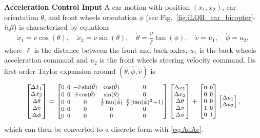 \documentclass[10pt,a4paper]{article} %
\begin{document}
\noindent\textbf{Acceleration Control Input}\newline
%
A car motion with position $(x_1,x_2)$, car orientation $\theta$, and front wheels orientation $\phi$ (see Fig.~\ref{fig:iLQR_car_bicopter}-\emph{left}) is characterized by equations
\begin{equation*}
	\dot{x}_1 = v \cos(\theta),\quad
	\dot{x}_2 = v \sin(\theta),\quad
	\dot{\theta} = \frac{v}{\ell} \tan(\phi),\quad
	\dot{v} = u_1,\quad
	\dot{\phi} = u_2,
\end{equation*}
where $\ell$ is the distance between the front and back axles, $u_1$ is the back wheels acceleration command and $u_2$ is the front wheels steering velocity command. 
Its first order Taylor expansion around $(\hat{\theta}, \hat{\phi}, \hat{v})$ is
\begin{equation}
	\setlength\arraycolsep{2pt}
	\footnotesize %
	\begin{bmatrix} \Delta\dot{x}_1 \\ \Delta\dot{x}_2 \\ \Delta\dot{\theta} \\ \Delta\dot{v} \\ \Delta\dot{\phi} \end{bmatrix} =
	\begin{bmatrix} 0 & 0 & -\hat{v}\sin(\hat{\theta}) & \cos(\hat{\theta}) & 0 \\
					0 & 0 & \hat{v}\cos(\hat{\theta}) & \sin(\hat{\theta}) & 0 \\
					0 & 0 & 0 & \frac{1}{\ell} \tan(\hat{\phi}) & \frac{\hat{v}}{\ell} (\tan(\hat{\phi})^2 \!+\! 1) \\
					0 & 0 & 0 & 0 & 0 \\
					0 & 0 & 0 & 0 & 0
	\end{bmatrix} 
	\begin{bmatrix} \Delta x_1 \\ \Delta x_2 \\ \Delta\theta \\ \Delta v \\ \Delta\phi \end{bmatrix} 
	+ 
	\setlength\arraycolsep{2pt}
	\footnotesize %
	\begin{bmatrix} 0 & 0 \\
					0 & 0 \\
					0 & 0 \\
					1 & 0 \\
					0 & 1
	\end{bmatrix} 
	\begin{bmatrix} \Delta u_1 \\ \Delta u_2 \end{bmatrix},
\end{equation}
which can then be converted to a discrete form with \eqref{eq:AdAc}.
\end{document}
